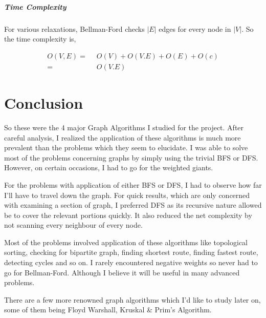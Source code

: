\documentclass[11pt,a4paper]{extarticle}
\begin{document}
\subparagraph{Time Complexity}
For various relaxations, Bellman-Ford checks $|E|$ edges for every node in $|V|$. So the time complexity is,

\begin{align}
O(V,E) =& \,\,\,O(V) + O(V.E) + O(E) + O(c)\\
	   =& \,\,\,O(V.E)
\end{align}

\section{Conclusion}
So these were the 4 major Graph Algorithms I studied for the project. After careful analysis, I realized the application of these algorithms is much more prevalent than the problems which they seem to elucidate. I was able to solve most of the problems concerning graphs by simply using the trivial BFS or DFS. However, on certain occasions, I had to go for the weighted giants. 

For the problems with application of either BFS or DFS, I had to observe how far I'll have to travel down the graph. For quick results, which are only concerned with examining a section of graph, I preferred DFS as its recursive nature allowed be to cover the relevant portions quickly. It also reduced the net complexity by not scanning every neighbour of every node.

Most of the problems involved application of these algorithms like topological sorting, checking for bipartite graph, finding shortest route, finding fastest route, detecting cycles and so on. I rarely encountered negative weights so never had to go for Bellman-Ford. Although I believe it will be useful in many advanced problems.

There are a few more renowned graph algorithms which I'd like to study later on, some of them being Floyd Warshall, Kruskal \& Prim's Algorithm. 
\end{document}
